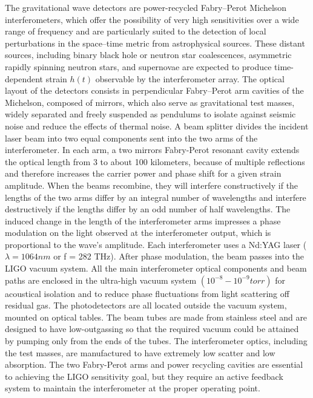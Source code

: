 \documentclass[binding=0.6cm, LaM]{sapthesis}
\begin{document}
	The gravitational wave detectors are power-recycled Fabry–Perot Michelson interferometers, 
	which offer the possibility of very high sensitivities over a wide range of frequency and 
	are particularly suited to the detection of local perturbations in the space–time metric from astrophysical sources.
	These distant sources, including binary black hole or neutron star coalescences, asymmetric rapidly spinning neutron stars, 
	and supernovae are expected to produce time-dependent strain $h(t)$ observable by the interferometer array.
	The optical layout of the detectors consists in perpendicular Fabry–Perot arm cavities of the Michelson, 
	composed of mirrors, which also serve as gravitational test masses, widely separated and 
	freely suspended as pendulums to isolate against seismic noise and reduce the effects of thermal noise.
	A beam splitter divides the incident laser beam into two equal components sent into the two arms of the interferometer. 
	In each arm, a two mirrors Fabry-Perot resonant cavity extends the optical length from 3 to about 100 kilometers, 
	because of multiple reflections and therefore increases the carrier power and phase shift for a given strain amplitude. 
	When the beams recombine, they will interfere constructively if the lengths of the two arms differ by an integral number 
	of wavelengths and interfere destructively if the lengths differ by an odd number of half wavelengths.
	The induced change in the length of the interferometer arms impresses a phase modulation on the 
	light observed at the interferometer output, which is proportional to the wave’s amplitude.
	Each interferometer uses a Nd:YAG laser  ($\lambda = 1064 nm$ or f = 282 THz).
	After phase modulation, the beam passes into the LIGO vacuum system. 
	All the main interferometer optical components and beam paths are enclosed in the ultra-high vacuum system 
	$(10^{−8} - 10^{−9} torr)$ for acoustical isolation and to reduce phase fluctuations from light scattering off residual gas. 
	The photodetectors are all located outside the vacuum system, mounted on optical tables. 
	The beam tubes are made from stainless steel and are designed to have low-outgassing 
	so that the required vacuum could be attained by pumping only from the ends of the tubes. 
	The interferometer optics, including the test masses, are manufactured to have extremely low scatter and low absorption.
	The two Fabry-Perot arms and power recycling cavities are essential to achieving the LIGO sensitivity goal, 
	but they require an active feedback system to maintain the interferometer at the proper operating point.
\end{document}
